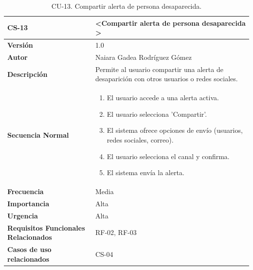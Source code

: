 \begin{table}[htbp] %
\centering
\begin{tabular}{ |m{3cm}|m{11cm}|  } 
\hline
\cellcolor[HTML]{B9E3F0}\centering\textbf{CS-13} & \cellcolor[HTML]{B9E3F0}\textbf{\textless Compartir alerta de persona desaparecida \textgreater}\\

\hline
\cellcolor[HTML]{EFEFEF}\textbf{Versión}             & 1.0  \\
\hline
\cellcolor[HTML]{EFEFEF}\textbf{Autor}                & Naiara Gadea Rodríguez Gómez\\
\hline
\cellcolor[HTML]{EFEFEF}\textbf{Descripción}                & { Permite al usuario compartir una alerta de desaparición con otros usuarios o redes sociales. }\\
\hline
\cellcolor[HTML]{EFEFEF}\textbf{Secuencia \newline Normal}                &                 
        \begin{enumerate}
            \item El usuario accede a una alerta activa.
            \item El usuario selecciona 'Compartir'.
            \item El sistema ofrece opciones de envío (usuarios, redes sociales, correo).
            \item El usuario selecciona el canal y confirma.
            \item El sistema envía la alerta.
        \end{enumerate}\\
\hline
\cellcolor[HTML]{EFEFEF}\textbf{Frecuencia}                & Media\\
\hline
\cellcolor[HTML]{EFEFEF}\textbf{Importancia}                & Alta\\
\hline
\cellcolor[HTML]{EFEFEF}\textbf{Urgencia}                & Alta\\
\hline
\cellcolor[HTML]{EFEFEF}\textbf{Requisitos Funcionales Relacionados}                & { RF-02, RF-03 }\\
\hline
\cellcolor[HTML]{EFEFEF}\textbf{Casos de uso relacionados}                & { CS-04 }\\
\hline
\end{tabular}
\caption{CU-13. Compartir alerta de persona desaparecida.}
\end{table}

